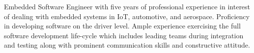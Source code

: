 \begin{cvletter}


Embedded Software Engineer with five years of professional experience in interest of dealing with embedded systems in IoT, automotive, and aerospace. Proficiency in developing software on the driver level. Ample experience exercising the full software development life-cycle which includes leading teams during integration and testing along with prominent communication skills and constructive attitude. %


\end{cvletter}